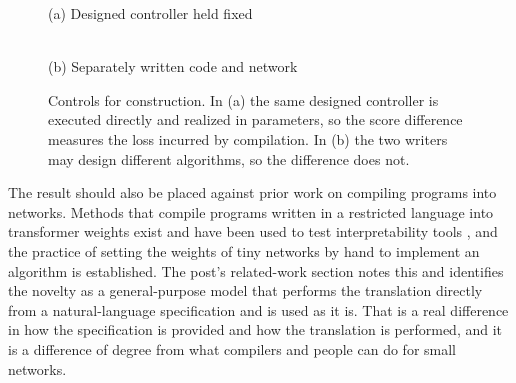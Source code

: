 \documentclass[11pt]{article}
\begin{document}
\begin{figure}[htbp]
\centering
\begin{minipage}{\textwidth}
\centering
{\small (a) Designed controller held fixed}\\[2pt]
\\[10pt]
{\small (b) Separately written code and network}\\[2pt]
\end{minipage}
\caption{Controls for construction. In (a) the same designed controller is executed directly and realized in parameters, so the score difference measures the loss incurred by compilation. In (b) the two writers may design different algorithms, so the difference does not.}
\label{fig:construction}
\end{figure}

The result should also be placed against prior work on compiling programs into networks. Methods that compile programs written in a restricted language into transformer weights exist and have been used to test interpretability tools \cite{lindner2023}, and the practice of setting the weights of tiny networks by hand to implement an algorithm is established. The post's related-work section notes this and identifies the novelty as a general-purpose model that performs the translation directly from a natural-language specification and is used as it is. That is a real difference in how the specification is provided and how the translation is performed, and it is a difference of degree from what compilers and people can do for small networks.
\end{document}
